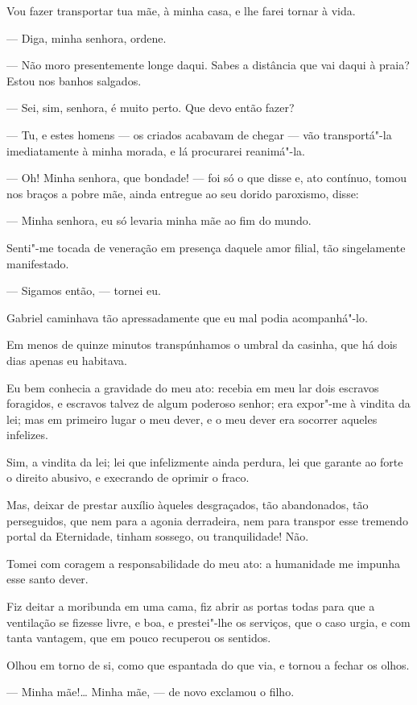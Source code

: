 Vou fazer transportar tua mãe, à minha casa, e lhe farei tornar à vida.

--- Diga, minha senhora, ordene.

--- Não moro presentemente longe daqui. Sabes a distância que vai daqui
à praia? Estou nos banhos salgados.

--- Sei, sim, senhora, é muito perto. Que devo então fazer?

--- Tu, e estes homens --- os criados acabavam de chegar --- vão
transportá"-la imediatamente à minha morada, e lá procurarei reanimá"-la.

--- Oh! Minha senhora, que bondade! --- foi só o que disse e, ato
contínuo, tomou nos braços a pobre mãe, ainda entregue ao seu dorido
paroxismo, disse:

--- Minha senhora, eu só levaria minha mãe ao fim do mundo.

Senti"-me tocada de veneração em presença daquele amor filial, tão
singelamente manifestado.

--- Sigamos então, --- tornei eu.

Gabriel caminhava tão apressadamente que eu mal podia acompanhá"-lo.

Em menos de quinze minutos transpúnhamos o umbral da casinha, que há
dois dias apenas eu habitava.

Eu bem conhecia a gravidade do meu ato: recebia em meu lar dois escravos
foragidos, e escravos talvez de algum poderoso senhor; era expor"-me à
vindita da lei; mas em primeiro lugar o meu dever, e o meu dever era
socorrer aqueles infelizes.

Sim, a vindita da lei; lei que infelizmente ainda perdura, lei que
garante ao forte o direito abusivo, e execrando de oprimir o fraco.

Mas, deixar de prestar auxílio àqueles desgraçados, tão abandonados, tão
perseguidos, que nem para a agonia derradeira, nem para transpor esse
tremendo portal da Eternidade, tinham sossego, ou tranquilidade! Não.

Tomei com coragem a responsabilidade do meu ato: a humanidade me impunha
esse santo dever.

Fiz deitar a moribunda em uma cama, fiz abrir as portas todas para que a
ventilação se fizesse livre, e boa, e prestei"-lhe os serviços, que o
caso urgia, e com tanta vantagem, que em pouco recuperou os sentidos.

Olhou em torno de si, como que espantada do que via, e tornou a fechar
os olhos.

--- Minha mãe!\ldots{} Minha mãe, --- de novo exclamou o filho.

